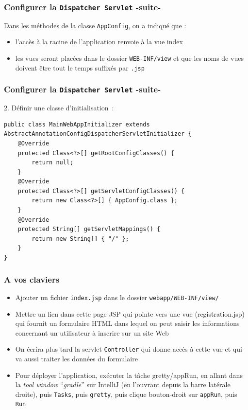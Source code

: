 \documentclass{beamer}
\begin{document}
\begin{frame}
	\frametitle{Configurer la \texttt{Dispatcher Servlet} -suite-}
	Dans les méthodes de la classe \texttt{AppConfig}, on a indiqué que :
		\begin{itemize}
			\item l'accès à la racine de l'application renvoie à la vue index
			\item les vues seront placées dans le dossier \texttt{WEB-INF/view} et que les noms de vues doivent être tout le temps suffixés par \texttt{.jsp}
		\end{itemize}	
	
\end{frame}

\begin{frame}[fragile]
	\frametitle{Configurer la \texttt{Dispatcher Servlet} -suite-}
	2. Définir une classe d'initialisation~:
\begin{lstlisting}
public class MainWebAppInitializer extends AbstractAnnotationConfigDispatcherServletInitializer {	
	@Override
	protected Class<?>[] getRootConfigClasses() {
		return null;
	}	
	@Override
	protected Class<?>[] getServletConfigClasses() {
		return new Class<?>[] { AppConfig.class };
	}	
	@Override
	protected String[] getServletMappings() {
		return new String[] { "/" };
	}
}
\end{lstlisting}
\end{frame}

\begin{frame}
	\frametitle{A vos claviers}
	\begin{itemize}
		\item Ajouter un fichier \texttt{index.jsp} dans le dossier \texttt{webapp/WEB-INF/view/}
		\item Mettre un lien dans cette page JSP qui pointe vers une vue (registration.jsp) qui fournit un formulaire HTML dans lequel on peut saisir les informations concernant un utilisateur à inscrire sur un site Web
		\item On écrira plus tard la servlet \texttt{Controller} qui donne accès à cette vue et qui va aussi traiter les données du formulaire
		\item Pour déployer l'application, exécuter la tâche gretty/appRun, en allant dans la \textit{tool window} ``\textit{gradle}'' sur IntelliJ (en l'ouvrant depuis la barre latérale droite), puis \texttt{Tasks}, puis \texttt{gretty}, puis clique bouton-droit sur \texttt{appRun}, puis \texttt{Run}
	\end{itemize}
\end{frame}
\end{document}
